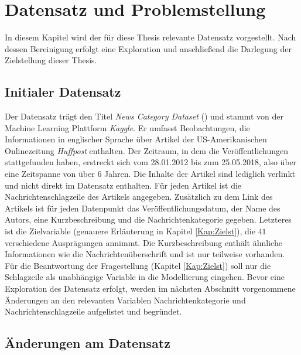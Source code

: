 \documentclass[a4paper,11pt]{article}
\begin{document}
\section{Datensatz und Problemstellung}

In diesem Kapitel wird der für diese Thesis relevante Datensatz vorgestellt. Nach dessen Bereinigung erfolgt eine Exploration und anschließend die Darlegung der Zielstellung dieser Thesis.


\subsection{Initialer Datensatz}

Der Datensatz trägt den Titel \textit{News Category Dataset} (\cite{dataset}) und stammt von der Machine Learning Plattform \textit{Kaggle}. Er umfasst  Beobachtungen, die Informationen in englischer Sprache über Artikel der US-Amerikanischen Onlinezeitung \textit{Huffpost} enthalten. Der Zeitraum, in dem die Veröffentlichungen stattgefunden haben, erstreckt sich vom 28.01.2012 bis zum 25.05.2018, also über eine Zeitspanne von über $6$ Jahren. Die Inhalte der Artikel sind lediglich verlinkt und nicht direkt im Datensatz enthalten. Für jeden Artikel ist die Nachrichtenschlagzeile des Artikels angegeben. Zusätzlich zu dem Link des Artikels ist für jeden Datenpunkt das Veröffentlichungsdatum, der Name des Autors, eine Kurzbeschreibung und die Nachrichtenkategorie gegeben. Letzteres ist die Zielvariable (genauere Erläuterung in Kapitel \ref{Kap:Zielst}), die $41$ verschiedene Ausprägungen annimmt. Die Kurzbeschreibung enthält ähnliche Informationen wie die Nachrichtenüberschrift und ist nur teilweise vorhanden. Für die Beantwortung der Fragestellung (Kapitel \ref{Kap:Zielst}) soll nur die Schlagzeile als unabhängige Variable in die Modellierung eingehen. Bevor eine Exploration des Datensatz erfolgt, werden im nächsten Abschnitt vorgenommene Änderungen an den relevanten Variablen Nachrichtenkategorie und Nachrichtenschlagzeile aufgelistet und begründet.


\subsection{Änderungen am Datensatz} \label{kap:2_2Aend}
\end{document}
